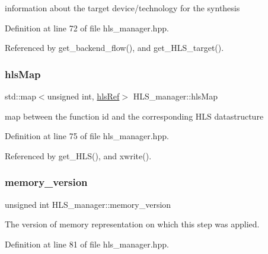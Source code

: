 information about the target device/technology for the synthesis 



Definition at line 72 of file hls\+\_\+manager.\+hpp.



Referenced by get\+\_\+backend\+\_\+flow(), and get\+\_\+\+H\+L\+S\+\_\+target().

\mbox{\label{classHLS__manager_a40f9e16abe8d9637c1dae00884ff7bb1}} 
\subsubsection{\texorpdfstring{hls\+Map}{hlsMap}}
{\footnotesize\ttfamily std\+::map$<$unsigned int, \hyperlink{hls_8hpp_a75d0c73923d0ddfa28c4843a802c73a7}{hls\+Ref}$>$ H\+L\+S\+\_\+manager\+::hls\+Map\hspace{0.3cm}{\ttfamily [private]}}



map between the function id and the corresponding H\+LS datastructure 



Definition at line 75 of file hls\+\_\+manager.\+hpp.



Referenced by get\+\_\+\+H\+L\+S(), and xwrite().

\mbox{\label{classHLS__manager_a98389ee79c39eb27fb1d690e09c17f05}} 
\subsubsection{\texorpdfstring{memory\+\_\+version}{memory\_version}}
{\footnotesize\ttfamily unsigned int H\+L\+S\+\_\+manager\+::memory\+\_\+version\hspace{0.3cm}{\ttfamily [private]}}



The version of memory representation on which this step was applied. 



Definition at line 81 of file hls\+\_\+manager.\+hpp.



